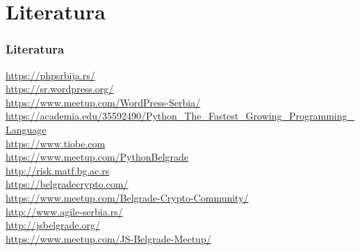 \documentclass[hyperref={bookmarks=false},aspectratio=169]{beamer}
\begin{document}
\section{Literatura}
\begin{frame}
\frametitle{Literatura}


\footnotesize{\url{https://phpsrbija.rs/}} \\
\footnotesize{\url{https://sr.wordpress.org/}} \\
\footnotesize{\url{https://www.meetup.com/WordPress-Serbia/}} \\
\footnotesize{\url{https://academia.edu/35592490/Python_The_Fastest_Growing_Programming_Language}} \\
\footnotesize{\url{https://www.tiobe.com}} \\
\footnotesize{\url{https://www.meetup.com/PythonBelgrade}} \\
\footnotesize{\url{http://risk.matf.bg.ac.rs}} \\
\footnotesize{\url{https://belgradecrypto.com/}} \\
\footnotesize{\url{https://www.meetup.com/Belgrade-Crypto-Community/}} \\
\footnotesize{\url{http://www.agile-serbia.rs/}} \\
\footnotesize{\url{http://jsbelgrade.org/}} \\
\footnotesize{\url{https://www.meetup.com/JS-Belgrade-Meetup/}} \\


\end{frame}

% 
% 
% 



\end{document}

